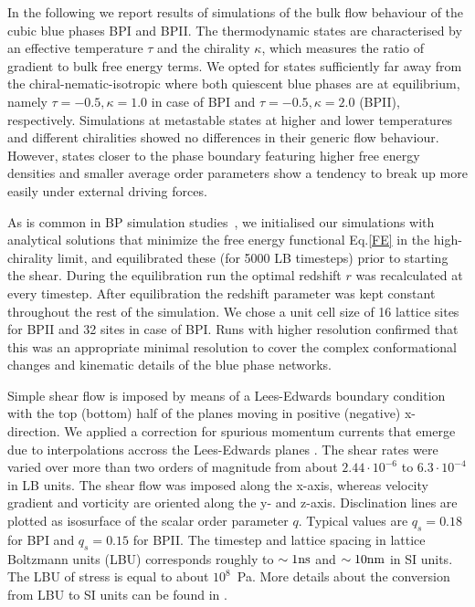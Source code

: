 \documentclass[aps,pre,reprint,superscriptaddress]{revtex4}
\begin{document}
In the following we report results of simulations of the bulk flow behaviour of the cubic blue 
phases BPI and BPII. The thermodynamic states are characterised by an effective temperature 
$\tau$ and the chirality $\kappa$, which measures the ratio of gradient to bulk free energy terms.
We opted for states sufficiently far away from the chiral-nematic-isotropic 
where both quiescent blue phases are at equilibrium, namely
$\tau=-0.5, \kappa=1.0$ in case of BPI and $\tau=-0.5, \kappa=2.0$ (BPII), respectively.
Simulations at metastable states at higher and lower temperatures and different chiralities showed 
no differences in their generic flow behaviour.
However, states closer to the phase boundary featuring higher free energy densities and 
smaller average order parameters show a tendency to break up more easily under external driving forces.

As is common in BP simulation studies~\cite{Henrich:2011a,Henrich:2010b}, we initialised our simulations with 
analytical solutions that minimize the free energy functional Eq.\ref{FE} in the high-chirality limit, 
and equilibrated these (for 5000 LB timesteps) prior to starting the shear. 
During the equilibration run the optimal redshift $r$ was recalculated at every timestep.
After equilibration the redshift parameter was kept constant throughout the rest of the simulation.
We chose a unit cell size of 16 lattice sites for BPII and 32 sites in case of BPI. 
Runs with higher resolution confirmed that this was an appropriate minimal resolution to cover 
the complex conformational changes and kinematic details of the blue phase networks.

Simple shear flow is imposed by means of a Lees-Edwards boundary condition ~\cite{Wagner:2002} with
the top (bottom) half of the planes moving in positive (negative) x-direction.
We applied a correction for spurious momentum currents that emerge due to interpolations accross 
the Lees-Edwards planes \cite{Henrich:2012a}.
The shear rates were varied over more than two orders of magnitude from about 
$2.44\cdot 10^{-6}$ to $6.3\cdot10^{-4}$ in LB units.
The shear flow was imposed along the x-axis, whereas velocity gradient and vorticity are oriented 
along the y- and z-axis.
Disclination lines are plotted as isosurface of the scalar order parameter $q$. Typical values 
are $q_s=0.18$ for BPI and $q_s=0.15$ for BPII.
The timestep and lattice spacing in lattice Boltzmann units (LBU) corresponds roughly to
$\sim 1 {\rm ns}$ and $\sim 10{\rm nm}$ in SI units. The LBU of stress
is equal to about $10^8$~Pa.
More details about the conversion from LBU to SI units can be found in
\cite{Henrich:2011a,Henrich:2010b}.
\end{document}
